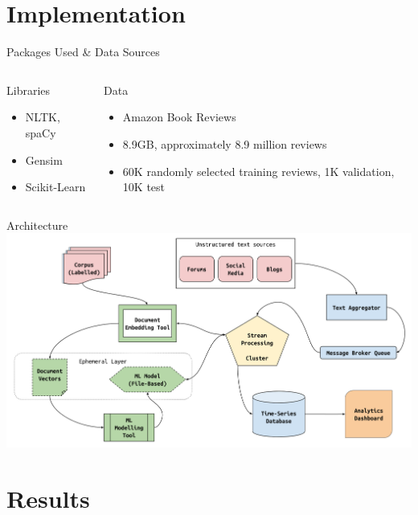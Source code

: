 \documentclass[aspectratio=169]{beamer}
\begin{document}
\section{Implementation}

\begin{frame}{Packages Used \& Data Sources}
	\begin{columns}[T] %
		\begin{column}{.3\textwidth}
			{\Large Libraries}
			\begin{itemize}
				\item NLTK, spaCy
				\item Gensim
				\item Scikit-Learn
			\end{itemize}
		\end{column}
		\hfill
		\begin{column}{.6\textwidth}
			{\Large Data}
			\begin{itemize}
				\item Amazon Book Reviews
				\item 8.9GB, approximately 8.9 million reviews
				\item 60K randomly selected training reviews, 1K validation, 10K test
			\end{itemize}
		\end{column}
	\end{columns}
\end{frame}

\begin{frame}{Architecture}
	\centering
	\includegraphics[width=.9\textwidth]{images/rapid-rate-system-arch.png}
\end{frame}


\section{Results}
\end{document}
